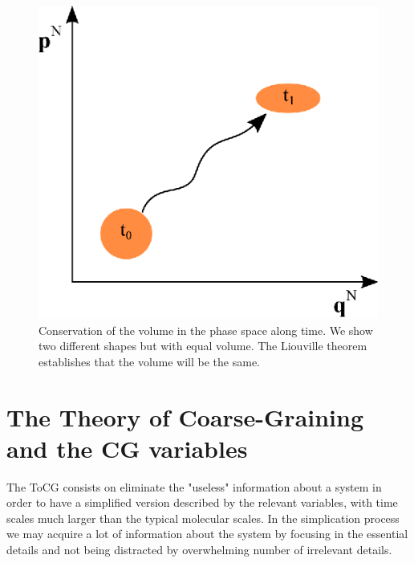 \documentclass[a4paper,openright,12pt]{book}
\begin{document}
\begin{figure}
    \centering
    \includegraphics[scale=0.9]{Liouville}
    \caption[The Liouville theorem]{Conservation of the volume in the phase space along time. We show two different shapes but with equal volume. The Liouville theorem establishes that the volume will be the same.}
    \label{fig:LiouvilleTh}
\end{figure}


%
%
\section{The Theory of Coarse-Graining and the CG variables}
The ToCG consists on eliminate the "useless" information about a system in order to have a simplified version described by the relevant variables, with time scales much larger than the typical molecular scales. 
In the simplication process we may acquire a lot of information about the system by focusing in the essential details and not being distracted by overwhelming number of irrelevant details.
\end{document}
